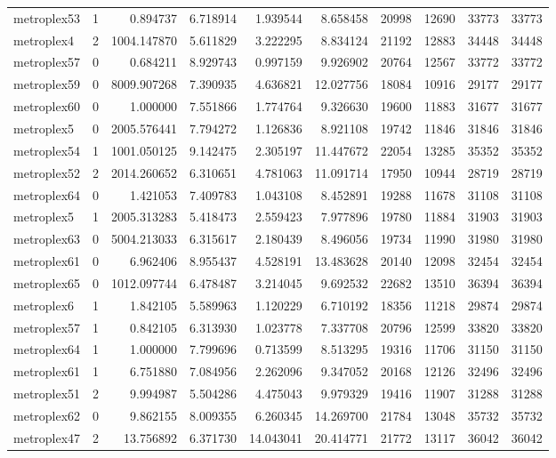\begin{longtable}{|l|r|r|r|r|r|r|r|r|r|}
metroplex53 & 1 & 0.894737 & 6.718914 & 1.939544 & 8.658458 & 20998 & 12690 & 33773 & 33773 \\
metroplex4 & 2 & 1004.147870 & 5.611829 & 3.222295 & 8.834124 & 21192 & 12883 & 34448 & 34448 \\
metroplex57 & 0 & 0.684211 & 8.929743 & 0.997159 & 9.926902 & 20764 & 12567 & 33772 & 33772 \\
metroplex59 & 0 & 8009.907268 & 7.390935 & 4.636821 & 12.027756 & 18084 & 10916 & 29177 & 29177 \\
metroplex60 & 0 & 1.000000 & 7.551866 & 1.774764 & 9.326630 & 19600 & 11883 & 31677 & 31677 \\
metroplex5 & 0 & 2005.576441 & 7.794272 & 1.126836 & 8.921108 & 19742 & 11846 & 31846 & 31846 \\
metroplex54 & 1 & 1001.050125 & 9.142475 & 2.305197 & 11.447672 & 22054 & 13285 & 35352 & 35352 \\
metroplex52 & 2 & 2014.260652 & 6.310651 & 4.781063 & 11.091714 & 17950 & 10944 & 28719 & 28719 \\
metroplex64 & 0 & 1.421053 & 7.409783 & 1.043108 & 8.452891 & 19288 & 11678 & 31108 & 31108 \\
metroplex5 & 1 & 2005.313283 & 5.418473 & 2.559423 & 7.977896 & 19780 & 11884 & 31903 & 31903 \\
metroplex63 & 0 & 5004.213033 & 6.315617 & 2.180439 & 8.496056 & 19734 & 11990 & 31980 & 31980 \\
metroplex61 & 0 & 6.962406 & 8.955437 & 4.528191 & 13.483628 & 20140 & 12098 & 32454 & 32454 \\
metroplex65 & 0 & 1012.097744 & 6.478487 & 3.214045 & 9.692532 & 22682 & 13510 & 36394 & 36394 \\
metroplex6 & 1 & 1.842105 & 5.589963 & 1.120229 & 6.710192 & 18356 & 11218 & 29874 & 29874 \\
metroplex57 & 1 & 0.842105 & 6.313930 & 1.023778 & 7.337708 & 20796 & 12599 & 33820 & 33820 \\
metroplex64 & 1 & 1.000000 & 7.799696 & 0.713599 & 8.513295 & 19316 & 11706 & 31150 & 31150 \\
metroplex61 & 1 & 6.751880 & 7.084956 & 2.262096 & 9.347052 & 20168 & 12126 & 32496 & 32496 \\
metroplex51 & 2 & 9.994987 & 5.504286 & 4.475043 & 9.979329 & 19416 & 11907 & 31288 & 31288 \\
metroplex62 & 0 & 9.862155 & 8.009355 & 6.260345 & 14.269700 & 21784 & 13048 & 35732 & 35732 \\
metroplex47 & 2 & 13.756892 & 6.371730 & 14.043041 & 20.414771 & 21772 & 13117 & 36042 & 36042 \\

\end{longtable}
